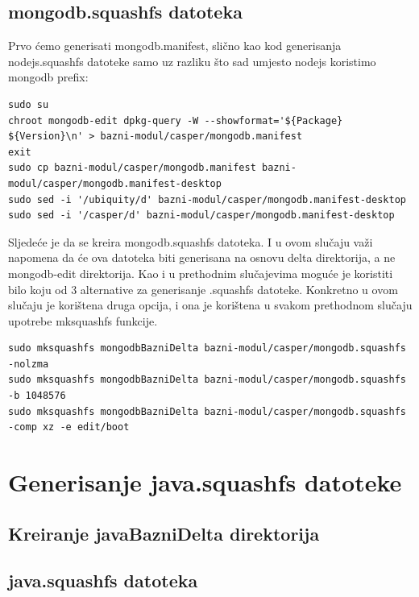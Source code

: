 \documentclass[12pt,vi]{mitthesis}
\begin{document}
\subsection*{mongodb.squashfs datoteka}
\indent
Prvo ćemo generisati mongodb.manifest, slično kao kod generisanja nodejs.squashfs datoteke samo uz razliku što sad umjesto nodejs koristimo mongodb prefix:
\begin{lstlisting}[style=BashInputStyle]
sudo su
chroot mongodb-edit dpkg-query -W --showformat='${Package} ${Version}\n' > bazni-modul/casper/mongodb.manifest
exit
sudo cp bazni-modul/casper/mongodb.manifest bazni-modul/casper/mongodb.manifest-desktop
sudo sed -i '/ubiquity/d' bazni-modul/casper/mongodb.manifest-desktop
sudo sed -i '/casper/d' bazni-modul/casper/mongodb.manifest-desktop
\end{lstlisting}
\indent
Sljedeće je da se kreira mongodb.squashfs datoteka. I u ovom slučaju važi napomena da će ova datoteka biti generisana na osnovu delta direktorija, a ne mongodb-edit direktorija. Kao i u prethodnim slučajevima moguće je koristiti bilo koju od 3 alternative za generisanje .squashfs datoteke. Konkretno u ovom slučaju je korištena druga opcija, i ona je korištena u svakom prethodnom slučaju upotrebe mksquashfs funkcije.
\begin{lstlisting}[style=BashInputStyle]
sudo mksquashfs mongodbBazniDelta bazni-modul/casper/mongodb.squashfs -nolzma 
sudo mksquashfs mongodbBazniDelta bazni-modul/casper/mongodb.squashfs -b 1048576
sudo mksquashfs mongodbBazniDelta bazni-modul/casper/mongodb.squashfs -comp xz -e edit/boot
\end{lstlisting}

\section*{Generisanje java.squashfs datoteke}
\indent

\subsection*{Kreiranje javaBazniDelta direktorija}
\indent

\subsection*{java.squashfs datoteka}
\indent
\end{document}
